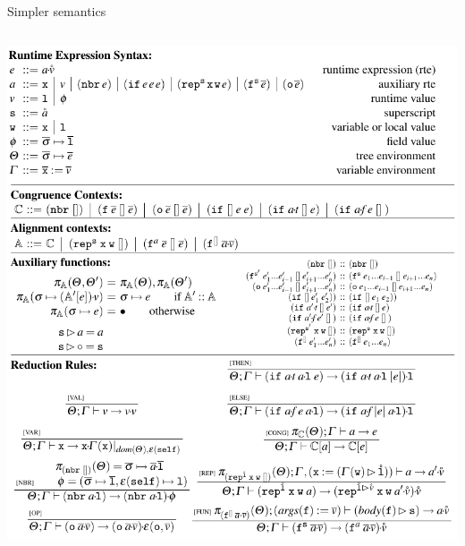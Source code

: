 \documentclass[presentation]{beamer} %
\begin{document}
\begin{frame}[fragile]{Simpler semantics}
\begin{columns}
\begin{column}{6cm}
\begin{framed}
        \includegraphics[width=1.015\columnwidth]{imgs/fcsem}
      \end{framed}
   \end{column}
  \end{columns}
\end{frame}
\end{document}
